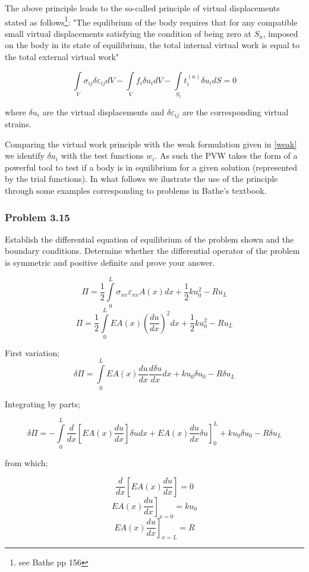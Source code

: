The above principle leads to the so-called principle of virtual displacements stated as follows\footnote{see Bathe pp 156}:
"The equlibrium of the body requires that for any compatible small virtual displacements satisfying the condition of being zero at $S_u$, imposed on the body in its state of equilibrium, the total internal virtual work is equal to the total external virtual work"

\[\int\limits_V {{\sigma _{ij}}\delta {\varepsilon _{ij}}dV}  - \int\limits_V {{f_i}\delta {u_i}dV}  - \int\limits_{{S_t}} {t_i^{(n)}\delta {u_i}dS}  = 0\]

where ${\delta {u_i}}$ are the virtual displacements and ${\delta {\varepsilon _{ij}}}$ are the corresponding virtual strains.

Comparing the virtual work principle with the weak formulation given in \cref{weak} we identify ${\delta {u_i}}$ with the test functions $w_i$. As such the PVW takes the form of a powerful tool to test if a body is in equilibrium for a given solution (represented by the trial functions). In what follows we ilustrate the use of the principle through some examples corresponding to problems in Bathe's textbook.

\subsubsection*{Problem 3.15}
Establish the differential equation of equilibrium of the problem shown and the boundary conditions. Determine whether the differential operator of the problem is symmetric and positive definite and prove your answer.

\[\Pi  = \frac{1}{2}\int\limits_0^L {{\sigma _{xx}}{\varepsilon _{xx}}A(x)dx} + \frac{1}{2}ku_0^2 - R{u_L} \]
\[\Pi  = \frac{1}{2}\int\limits_0^L {EA(x){{\left( {\frac{{du}}{{dx}}} \right)}^2}dx + \frac{1}{2}ku_0^2}  - R{u_L}\]

First variation;
\[\delta \Pi  = \int\limits_0^L {EA(x)\frac{{du}}{{dx}}\frac{{d\delta u}}{{dx}}dx + k{u_0}\delta {u_0}}  - R\delta {u_L}\]

Integrating by parts;

\[\delta \Pi  =  - \int\limits_0^L {\frac{d}{{dx}}\left[ {EA(x)\frac{{du}}{{dx}}} \right]\delta udx + \left. {EA(x)\frac{{du}}{{dx}}\delta u} \right]_0^L + k{u_0}\delta {u_0}}  - R\delta {u_L}\]

from which;

\[\frac{d}{{dx}}\left[ {EA(x)\frac{{du}}{{dx}}} \right] = 0\]
\[{\left. {EA(x)\frac{{du}}{{dx}}} \right]_{x = 0}} = k{u_0}\]
\[{\left. {EA(x)\frac{{du}}{{dx}}} \right]_{x = L}} = R\]





